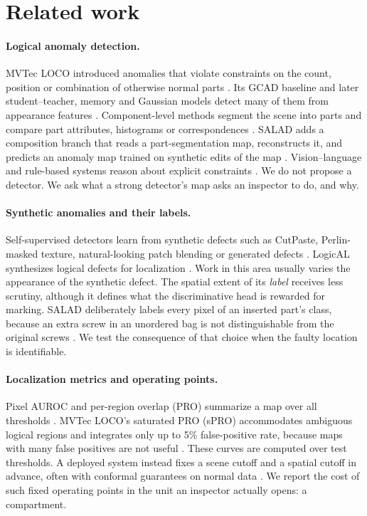 \section{Related work}
\label{sec:related}
\paragraph{Logical anomaly detection.}
MVTec LOCO introduced anomalies that violate constraints on the count, position or combination of otherwise normal parts \cite{bergmann2022}. Its GCAD baseline and later student--teacher, memory and Gaussian models detect many of them from appearance features \cite{bergmann2022,batzner2024,roth2022,rippel2021}. Component-level methods segment the scene into parts and compare part attributes, histograms or correspondences \cite{liu2023,kim2024psad,hsieh2024csad,peng2025}. SALAD adds a composition branch that reads a part-segmentation map, reconstructs it, and predicts an anomaly map trained on synthetic edits of the map \cite{fucka2025}. Vision--language and rule-based systems reason about explicit constraints \cite{jeong2023winclip,zhou2024anomalyclip,zhang2025logsad,ji2026,zhang2026logico}. We do not propose a detector. We ask what a strong detector's map asks an inspector to do, and why.

\paragraph{Synthetic anomalies and their labels.}
Self-supervised detectors learn from synthetic defects such as CutPaste, Perlin-masked texture, natural-looking patch blending or generated defects \cite{li2021cutpaste,zavrtanik2021draem,schluter2022nsa,hu2024anomalydiffusion}. LogicAL synthesizes logical defects for localization \cite{zhao2024}. Work in this area usually varies the appearance of the synthetic defect. The spatial extent of its \emph{label} receives less scrutiny, although it defines what the discriminative head is rewarded for marking. SALAD deliberately labels every pixel of an inserted part's class, because an extra screw in an unordered bag is not distinguishable from the original screws \cite{fucka2025}. We test the consequence of that choice when the faulty location is identifiable.

\paragraph{Localization metrics and operating points.}
Pixel AUROC and per-region overlap (PRO) summarize a map over all thresholds \cite{bergmann2021ijcv}. MVTec LOCO's saturated PRO (sPRO) accommodates ambiguous logical regions and integrates only up to 5\% false-positive rate, because maps with many false positives are not useful \cite{bergmann2022}. These curves are computed over test thresholds. A deployed system instead fixes a scene cutoff and a spatial cutoff in advance, often with conformal guarantees on normal data \cite{bates2023,angelopoulos2023}. We report the cost of such fixed operating points in the unit an inspector actually opens: a compartment.

